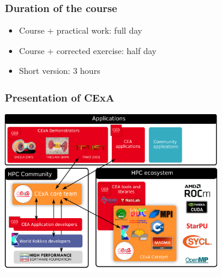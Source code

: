\documentclass[aspectratio=169]{beamer}
\begin{document}

\begin{frame}
    \frametitle{Duration of the course}
    
    \begin{itemize}
        \item Course + practical work: full day 
        \item Course + corrected exercise: half day
        \item Short version: 3 hours
    \end{itemize}
    
 \end{frame}


\begin{frame}
\frametitle{Presentation of CExA}

\begin{center}
    \includegraphics[width=0.7\textwidth]{../../images/cexa.png}
\end{center}

\end{frame}

\end{document}
